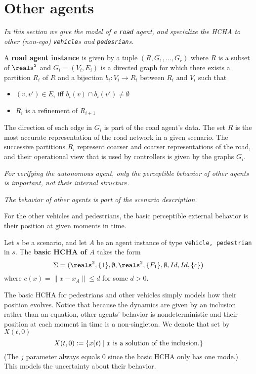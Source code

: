 \section{Other agents}
\label{otherAgents}

{\it In this section we give the model of a \texttt{road} agent, and specialize the HCHA to other (non-ego)  \texttt{vehicle}s and \texttt{pedesrian}s.}

\begin{defn}
	\label{def:road}
	A \textbf{road agent instance} is given by a tuple $(R, G_1,\ldots, G_r)$ where 
	$R$ is a subset of $\reals^2$
	and $G_i = (V_i,E_i)$ is a directed graph for which there exists a partition $R_i$ of $R$ and a bijection $b_i: V_i \rightarrow R_i$ between $R_i$ and $V_i$ such that
	\begin{itemize}
		\item  $(v,v') \in E_i$ iff $b_i(v)\cap b_i(v') \neq \emptyset$
		\item $R_i$ is a refinement of $R_{i+1}$
	\end{itemize}
	\end{defn}

The direction of each edge in $G_i$ is part of the road agent's data.
The set $R$ is the most accurate representation of the road network in a given scenario.
The successive partitions $R_i$ represent coarser and coarser representations of the road, and their operational view that is used by controllers is given by the graphs $G_i$.

{\it For verifying the autonomous agent, only the perceptible behavior of other agents is important, not their internal structure.}

{\it The behavior of other agents is part of the scenario description.}

For the other vehicles and pedestrians, the basic perceptible external behavior is their position at given moments in time. 
\begin{defn}
	\label{def:otherAgentsBehavior}
	Let $s$ be a scenario, and let $A$ be an agent instance of type \texttt{vehicle, pedestrian} in $s$.
	The \textbf{basic HCHA of $A$} takes the form 
	\[\Sys = (\reals^2, \{1\}, \emptyset, \reals^2, \{F_1\}, \emptyset, Id, Id, \{c\})\]
	where $c(x) = \|x-x_A\| \leq d$ for some $d > 0$.
	\end{defn}

The basic HCHA for pedestrians and other vehicles simply models how their position evolves. 
Notice that because the dynamics are given by an inclusion rather than an equation, other agents' behavior is nondeterministic and their position at each moment in time is a non-singleton.
We denote that set by $X(t,0)$
\[X(t,0) := \{x(t) \;|\; x \text{ is a solution of the inclusion}.\}\]
(The $j$ parameter always equals 0 since the basic HCHA only has one mode.)
This models the uncertainty about their behavior.

